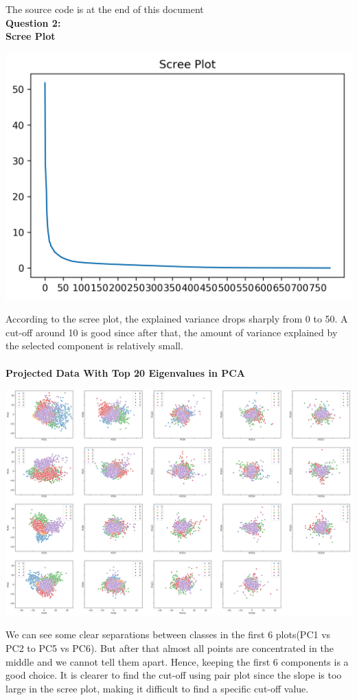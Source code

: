 \documentclass[12pt]{article}
\begin{document}
\noindent
{\LARGE The source code is at the end of this document}\\
\textbf{\large Question 2:}\\
\textbf{Scree Plot}
\begin{center}
    \includegraphics[width=14cm]{Q2_ScreePlot.png}
\end{center}
\noindent
According to the scree plot, the explained variance drops sharply from 0 to 50. A cut-off around 10 is good since after that, the amount of variance explained by the selected component is relatively small.\\\\
\textbf{Projected Data With Top 20 Eigenvalues in PCA}
\begin{center}
    \includegraphics[width=18cm]{Q2_PCATop19.png}
\end{center}
\noindent
We can see some clear separations between classes in the first 6 plots(PC1 vs PC2 to PC5 vs PC6). But after that almost all points are concentrated in the middle and we cannot tell them apart. Hence, keeping the first 6 components is a good choice. It is clearer to find the cut-off using pair plot since the slope is too large in the scree plot, making it difficult to find a specific cut-off value.\\\\
\end{document}
